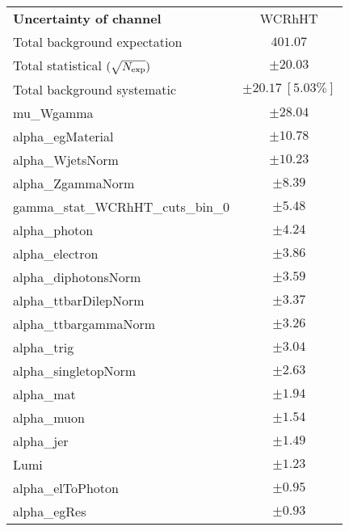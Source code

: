 
\begin{table}
\begin{center}
\setlength{\tabcolsep}{0.0pc}
\begin{tabular*}{\textwidth}{@{\extracolsep{\fill}}lc}
\noalign{\smallskip}\hline\noalign{\smallskip}
{\bf Uncertainty of channel}                                    & WCRhHT            \\
\noalign{\smallskip}\hline\noalign{\smallskip}
Total background expectation             &  $401.07$       \\
\noalign{\smallskip}\hline\noalign{\smallskip}
Total statistical $(\sqrt{N_{\rm exp}})$              & $\pm 20.03$       \\
Total background systematic               & $\pm 20.17\ [5.03\%] $             \\
\noalign{\smallskip}\hline\noalign{\smallskip}
\noalign{\smallskip}\hline\noalign{\smallskip}
mu\_Wgamma         & $\pm 28.04$       \\
alpha\_egMaterial         & $\pm 10.78$       \\
alpha\_WjetsNorm         & $\pm 10.23$       \\
alpha\_ZgammaNorm         & $\pm 8.39$       \\
gamma\_stat\_WCRhHT\_cuts\_bin\_0         & $\pm 5.48$       \\
alpha\_photon         & $\pm 4.24$       \\
alpha\_electron         & $\pm 3.86$       \\
alpha\_diphotonsNorm         & $\pm 3.59$       \\
alpha\_ttbarDilepNorm         & $\pm 3.37$       \\
alpha\_ttbargammaNorm         & $\pm 3.26$       \\
alpha\_trig         & $\pm 3.04$       \\
alpha\_singletopNorm         & $\pm 2.63$       \\
alpha\_mat         & $\pm 1.94$       \\
alpha\_muon         & $\pm 1.54$       \\
alpha\_jer         & $\pm 1.49$       \\
Lumi         & $\pm 1.23$       \\
alpha\_elToPhoton         & $\pm 0.95$       \\
alpha\_egRes         & $\pm 0.93$       \\

\end{tabular*}
\end{center}
\end{table}
